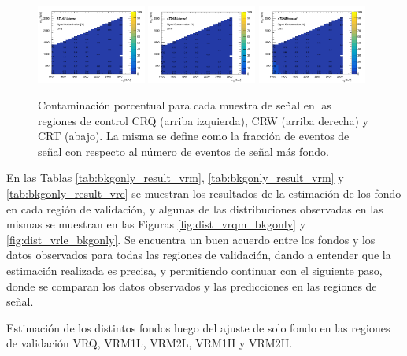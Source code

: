 \begin{figure}[ht!]

  \centering
  \includegraphics[width=0.32\textwidth]{images/results/signal_contamination_bb_CRQ_139ifb.pdf}
  \includegraphics[width=0.32\textwidth]{images/results/signal_contamination_bb_CRW_139ifb.pdf}
  \includegraphics[width=0.32\textwidth]{images/results/signal_contamination_bb_CRT_139ifb.pdf}
  \caption{Contaminación porcentual para cada muestra de señal en las regiones de control CRQ (arriba izquierda), CRW (arriba derecha) y CRT (abajo). La misma se define como la fracción de eventos de señal con respecto al número de eventos de señal más fondo.}
  \label{fig:signal_contamination_CR_bb}

\end{figure}


En las Tablas \ref{tab:bkgonly_result_vrm}, \ref{tab:bkgonly_result_vrm} y \ref{tab:bkgonly_result_vre} se muestran los resultados de la estimación de los fondo en cada región de validación, y algunas de las distribuciones observadas en las mismas se muestran en las Figuras \ref{fig:dist_vrqm_bkgonly} y \ref{fig:dist_vrle_bkgonly}. Se encuentra un buen acuerdo entre los fondos y los datos observados para todas las regiones de validación, dando a entender que la estimación realizada es precisa, y permitiendo continuar con el siguiente paso, donde se comparan los datos observados y las predicciones en las regiones de señal. 


\begin{table}[ht!]
  \centering
  \caption{Estimación de los distintos fondos luego del ajuste de solo fondo en las regiones de validación VRQ, VRM1L, VRM2L, VRM1H y VRM2H.}
  \resizebox{\textwidth}{!}{}
  \label{tab:bkgonly_result_vrm}
\end{table}


